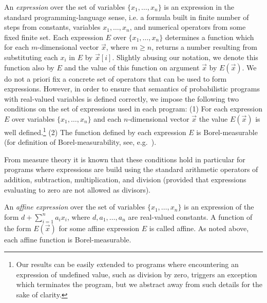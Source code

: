 \smallskip{}
An \emph{expression} over the set of variables $\{x_1,\dots,x_n\}$ 
is an expression in the standard programming-language sense, i.e. a formula 
built in finite number of steps from constants, variables $x_1,\dots,x_n$, and 
numerical operators from some fixed finite set. Each expression $E$ over 
$\{x_1,\dots,x_n\}$ 
determines a function which for each $m$-dimensional vector $\vec{x}$, where 
$m\geq n$,  
returns a number resulting from substituting each $x_i$ in $E$ by $\vec{x}[i]$. 
Slightly abusing our notation, we denote this function also by $E$ and the 
value of this function on argument $\vec{x}$ by $E(\vec{x})$. We do not a priori fix a concrete set of operators that can be used to form expressions. However, in order to ensure that semantics of probabilistic programs with real-valued variables is defined correctly, we impose the following two conditions on the set of expressions used in each program:
(1)
For each expression $E$ over variables $\{x_1,\dots,x_n\}$ and each $n$-dimensional vector $\vec{x}$ the value $E(\vec{x})$ is well defined.\footnote{Our results can be easily extended to programs where encountering an expression of undefined value, such as division by zero, triggers an exception which terminates the program, but we abstract away from such details for the sake of clarity.}
(2)
The function defined by each expression $E$ is Borel-measurable (for definition of Borel-measura\-bility, see, e.g.~\cite{Billingsley:book}).

From measure theory it is known that these conditions hold in particular for programs where expressions are build using the standard arithmetic operators of addition, subtraction, multiplication, and division (provided that expressions evaluating to zero are not allowed as divisors).


\smallskip{}
An \emph{affine expression} over the set of variables $\{x_1,\dots,x_n\}$ is an 
expression of the form $d+\sum_{i=1}^{n}a_i
x_i$, where  $d,a_1,\dots,a_n$ are real-valued
constants.  A function of the form $E(\vec{x})$ for some affine expression $E$ 
is called affine. As noted above, each affine function is Borel-measurable.

